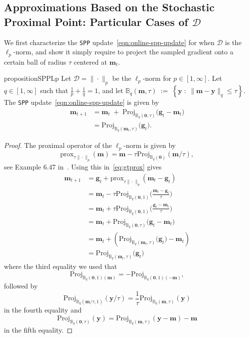 \documentclass[10pt]{article} %
\renewcommand{\vec}[1]{\bm{#1}}
\newcommand{\norm}[1]{ \|#1 \|}
\newcommand{\prox}[1]{\mathrm{prox}_{#1}}
\newcommand{\dist}{\mathcal{D}}
\newcommand{\Proj}[1]{\mathrm{Proj}_{#1}} %
\newcommand{\SPP}{\texttt{SPP}}
\begin{document}
\subsection{Approximations Based on the Stochastic Proximal Point: Particular Cases of $\mathcal{D}$}
\label{app:sec:SPP-updates-particular-cases}


We first characterize the \SPP{} update~\eqref{eqn:online-spp-update} for when $\dist$ is the $\ell_p$-norm, and show it simply require to project the sampled gradient onto a certain ball of radius $\tau$ centered at $\vec{m}_t$. 

\begin{restatable}{proposition}{SPPLp}\label{prop:pnormview}
    Let $\dist = \|\cdot\|_p$ be the $\ell_p$-norm for $p \in [1, \infty].$ Let $q \in [1, \infty]$ such that $\frac{1}{p} + \frac{1}{q}=1$, and let 
    $\mathbb{B}_{q}(\vec{m},\tau)  \; := \; \left\{ \vec{y} \; : \; \norm{\vec{m}-\vec{y}}_q \leq \tau \right\}.$
    The \SPP{} update~\eqref{eqn:online-spp-update} is given by
    \begin{align}
        \vec{m}_{t+1} &=  \vec{m}_t \; +\; \Proj{\mathbb{B}_{q}(\vec{0},\tau)  } \big( \vec{g}_t-\vec{m}_t \big) \label{eq:projzero} \\
        &= \Proj{\mathbb{B}_q( \vec{m}_t,\tau) }\big(  \vec{g}_t \big).\label{eq:projmt}
    \end{align}
\end{restatable}
%
\begin{proof}
The proximal operator of the $\ell_p$-norm is given by 
$$\prox{\tau \norm{\cdot}_p}(\vec{m})  = \vec{m} - \tau \Proj{\mathbb{B}_{q}(\vec{0}) }(\vec{m}/\tau),$$
see Example 6.47 in~\citet{Beck2017}. Using this in~\eqref{eq:gtprox} gives
\begin{align*}
 \vec{m}_{t+1} &=    \vec{g}_t  + \prox{\tau\norm{\cdot}_p}(\vec{m}_t-\vec{g}_t) \\
 &=  \vec{m}_t  -\tau \Proj{\mathbb{B}_{q}(\vec{0},1) }\big(\frac{\vec{m}_t-\vec{g}_t}{\tau}\big)\\
  &=  \vec{m}_t  +\tau \Proj{\mathbb{B}_{q}(\vec{0},1) }\big(\frac{\vec{g}_t-\vec{m}_t}{\tau}\big)\\
    &=  \vec{m}_t  + \Proj{\mathbb{B}_{q}(\vec{0},\tau) }\big( \vec{g}_t-\vec{m}_t \big)\\
  &=  \vec{m}_t  +\left( \Proj{\mathbb{B}_{q}(\vec{m}_t,\tau) }\big( \vec{g}_t \big)- \vec{m}_t\right)\\
  &= \Proj{\mathbb{B}_{q}( \vec{m}_t,\tau) }\big(  \vec{g}_t \big) 
\end{align*}
where the third equality we used that 
$$\Proj{\mathbb{B}_{q}(\vec{0},1)(\vec{m})} = -\Proj{\mathbb{B}_{q}(\vec{0},1)(-\vec{m})},  $$ followed by
\[\Proj{\mathbb{B}_{q}(\vec{m}/\tau,1)}(\vec{y}/\tau) = \frac{1}{\tau} \Proj{\mathbb{B}_{q}(\vec{m},\tau)}(\vec{y})   \]
in the  fourth equality and 
\[  \Proj{\mathbb{B}_{q}(\vec{0},\tau)}(\vec{y}) = \Proj{\mathbb{B}_{q}(\vec{m},\tau)}(\vec{y}-\vec{m}) - \vec{m}  \]
in the fifth equality.
\end{proof}
\end{document}

